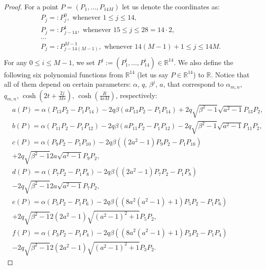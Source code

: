 \documentclass{amsart}
\theoremstyle{definition}
\theoremstyle{remark}
\renewcommand\leq\leqslant
\numberwithin{equation}{section}
\theoremstyle{definition}
\theoremstyle{remark}
\begin{document}
\begin{proof}
	For a point $P=\left(P_1,\ldots,P_{14M}\right)$ let us denote the coordinates as: \begin{equation}
	    \begin{aligned}
	        &P_{j}=:P^0_j,\text{ whenever }1\leq j\leq 14,\\
            &P_{j}=:P^1_{j-14},\text{ whenever }15\leq j\leq 28=14\cdot 2,\\
            &\ldots\\
            &P_{j}=:P^{M-1}_{j-14(M-1)},\text{ whenever }14(M-1)+1\leq j\leq 14M.\\
             \end{aligned}
	\end{equation}For any $0\leq i\leq M-1$, we set $P^i:=\left(P^i_1,\ldots,P^i_{14}\right)\in\mathbb{R}^{14}.$ We also define the following six polynomial functions from $\mathbb{R}^{14}$ (let us say $P\in\mathbb{R}^{14}$) to $\mathbb{R}$. Notice that all of them depend on certain parameters: $\alpha$, $q$, $\beta^j$, $a$, that correspond to $\alpha_{m,n}$, $q_{m,n}$, $\cosh\left(2t+\frac{2j}{Ms}\right)$, $\cosh\left(\frac{R}{4sM}\right)$, respectively:
    \begin{equation}
        \begin{aligned}
            &a(P)=\alpha\left(P_{13}P_{2}-P_{1}P_{14}\right)-2q\beta\left(aP_{13}P_{2}-P_{1}P_{14}\right)+2q\sqrt{\beta^2-1}\sqrt{a^2-1}P_{13}P_2,\\  &b(P)=\alpha\left(P_{11}P_{2}-P_{1}P_{12}\right)-2q\beta\left(aP_{11}P_{2}-P_{1}P_{12}\right)-2q\sqrt{\beta^2-1}\sqrt{a^2-1}P_{11}P_2,\\  &c(P)=\alpha\left(P_{9}P_{2}-P_{1}P_{10}\right)-2q\beta\left(\left(2a^2-1\right)P_{9}P_{2}-P_{1}P_{10}\right)\\&+2q\sqrt{\beta^2-1}2a\sqrt{a^2-1}P_{9}P_2,\\  &d(P)=\alpha\left(P_{7}P_{2}-P_{1}P_{8}\right)-2q\beta\left(\left(2a^2-1\right)P_{7}P_{2}-P_{1}P_{8}\right)\\&-2q\sqrt{\beta^2-1}2a\sqrt{a^2-1}P_{7}P_2,\\  &e(P)=\alpha\left(P_{5}P_{2}-P_{1}P_{6}\right)-2q\beta\left(\left(8a^2\left(a^2-1\right)+1\right)P_{5}P_{2}-P_{1}P_{6}\right)\\&+2q\sqrt{\beta^2-1}2\left(2a^2-1\right)\sqrt{\left(a^2-1\right)^2+1}P_{5}P_2,\\  &f(P)=\alpha\left(P_{3}P_{2}-P_{1}P_{4}\right)-2q\beta\left(\left(8a^2\left(a^2-1\right)+1\right)P_{3}P_{2}-P_{1}P_{4}\right)\\&-2q\sqrt{\beta^2-1}2\left(2a^2-1\right)\sqrt{\left(a^2-1\right)^2+1}P_{3}P_2.
        \end{aligned}
    \end{equation}
    

\end{proof}
\end{document}
